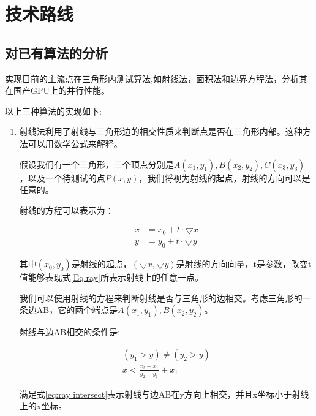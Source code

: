 \cleardoublepage

\section{技术路线}

\subsection{对已有算法的分析}

\label{subsubsection:analysis}
实现目前的主流点在三角形内测试算法,如射线法，面积法和边界方程法，分析其在国产GPU上的并行性能。

以上三种算法的实现如下:

\begin{enumerate}
\item 
射线法利用了射线与三角形边的相交性质来判断点是否在三角形内部。这种方法可以用数学公式来解释。

假设我们有一个三角形，三个顶点分别是$A(x_1,y_1 ),B(x_2,y_2 ),C(x_3,y_3)$，以及一个待测试的点$P(x,y)$，我们将视为射线的起点，射线的方向可以是任意的。



射线的方程可以表示为：

\begin{equation}
    \label{Eq.ray}
    \begin{split}
        x&=x_0+t\cdot \bigtriangledown x \\
        y&=y_0+t\cdot \bigtriangledown y 
    \end{split}
\end{equation}

其中$(x_0,y_0)$是射线的起点，$(\bigtriangledown x,\bigtriangledown y)$是射线的方向向量，t是参数，改变t值能够表现式\ref{Eq.ray}所表示射线上的任意一点。



我们可以使用射线的方程来判断射线是否与三角形的边相交。考虑三角形的一条边AB，它的两个端点是$A(x_1,y_1 ),B(x_2,y_2)$。

射线与边AB相交的条件是:

\begin{equation}
    \label{eq:ray intersect}
    \begin{split}
        (y_1>y) \ne (y_2>y) \\
        x < \frac{x_2-x_1}{y_2-y_1}+x_1
    \end{split}
\end{equation}

满足式\ref{eq:ray intersect}表示射线与边AB在y方向上相交，并且x坐标小于射线上的x坐标。




\end{enumerate}
